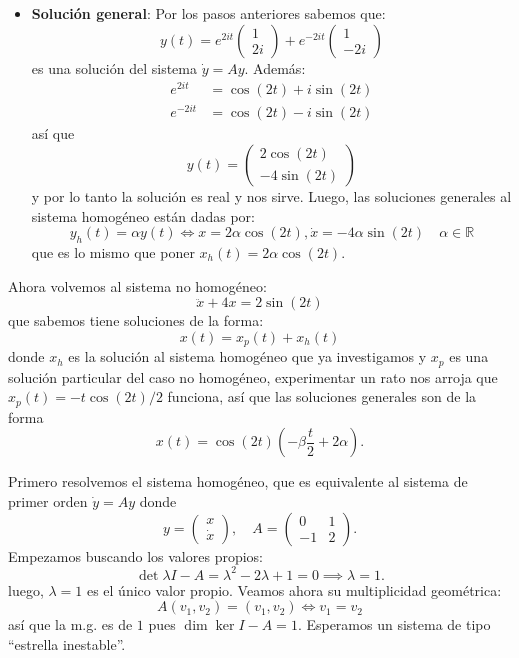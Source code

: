 \documentclass[10pt]{article}
\begin{document}
\begin{plist}
\begin{itemize}
    \item \textbf{Solución general}: Por los pasos anteriores sabemos que:
    \[
        y(t) =
        e^{2it} \begin{pmatrix} 1 \\ 2i \end{pmatrix}
        +
        e^{-2it} \begin{pmatrix} 1 \\ -2i \end{pmatrix}
    \]
    es una solución del sistema \(\dot{y} = Ay\). Además:
    \begin{align*}
        e^{2it} &= \cos(2t) + i\sin(2t)\\
        e^{-2it} &= \cos(2t) - i\sin(2t)
    \end{align*}
    así que
    \[
        y(t) =
        \begin{pmatrix}
            2\cos(2t) \\
            -4\sin(2t)
        \end{pmatrix}
    \]
    y por lo tanto la solución es real y nos sirve. Luego, las soluciones
    generales al sistema homogéneo están dadas por:
    \[
        y_h(t) = \alpha y(t)
        \iff
        x = 2 \alpha \cos(2t), \dot{x} = -4\alpha\sin(2t)
        \quad \alpha \in \mathbb{R}
    \]
    que es lo mismo que poner \(x_h(t) = 2\alpha\cos(2t)\).
\end{itemize}
Ahora volvemos al sistema no homogéneo:
\[
    \ddot{x} + 4x = 2\sin(2t)
\]
que sabemos tiene soluciones de la forma:
\[
    x(t) = x_p(t) + x_h(t)
\]
donde \(x_h\) es la solución al sistema homogéneo que ya investigamos y \(x_p\)
es una solución particular del caso no homogéneo, experimentar un rato nos
arroja que \(x_p(t) = -t\cos(2t)/2\) funciona, así que las soluciones generales
son de la forma
\[
    x(t) = \cos(2t) (-\beta\frac{t}{2} + 2\alpha)
.\]
\item Primero resolvemos el sistema homogéneo, que es equivalente al sistema de
primer orden \(\dot{y} = Ay\) donde
\[
    y = \begin{pmatrix} x \\ \dot{x} \end{pmatrix},
    \quad
    A =
    \begin{pmatrix}
    0 & 1\\
    -1 & 2
    \end{pmatrix}
.\]
Empezamos buscando los valores propios:
\[
    \det \lambda I - A
    =
    \lambda^2 - 2\lambda + 1
    =
    0
    \implies
    \lambda = 1
.\]
luego, \(\lambda = 1\) es el único valor propio. Veamos ahora su multiplicidad
geométrica:
\[
    A(v_1, v_2) = (v_1, v_2)
    \iff
    v_1 = v_2
\]
así que la m.g. es de \(1\) pues \(\dim \ker I - A = 1\). Esperamos un
sistema de tipo ``estrella inestable''.


\end{plist}
\end{document}
